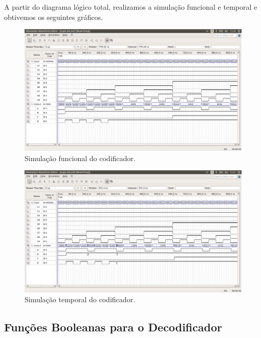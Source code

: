 \documentclass[12pt]{article}
\begin{document}
A partir do diagrama lógico total, realizamos a simulação funcional e temporal e obtivemos os seguintes gráficos.

\begin{figure}[H]
	\centering
	\includegraphics[width=1\textwidth]{functionalcoder.png}
	\caption{Simulação funcional do codificador.}
	\label{fig:funccoder}
\end{figure}

\begin{figure}[H]
	\centering
	\includegraphics[width=1\textwidth]{timingcoder.png}
	\caption{Simulação temporal do codificador.}
	\label{fig:timecoder}
\end{figure}


\subsection{Funções Booleanas para o Decodificador}
\label{sec:Decod}
\end{document}
